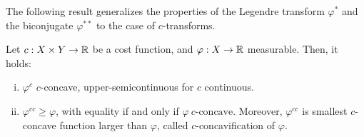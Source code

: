\documentclass[../main.tex]{subfiles}
\begin{document}
The following result generalizes the properties of the Legendre transform $\varphi^*$ and the biconjugate $\varphi^{**}$ to the case of $c$-transforms.

\begin{proposition}
    Let $c: X\times Y\to \mathbb{R}$ be a cost function, and $\varphi: X\to \mathbb{R}$ measurable. Then, it holds:
    \begin{enumerate}[(i)]
        \item $\varphi^c$ $c$-concave, upper-semicontinuous for $c$ continuous.
        \item $\varphi^{cc} \geq \varphi$, with equality if and only if $\varphi \ c\text{-concave}$.
        Moreover, $\varphi^{cc}$ is smallest $c$-concave function larger than $\varphi$, called $c$-concavification of $\varphi$.
    \end{enumerate}
\end{proposition}
\end{document}
